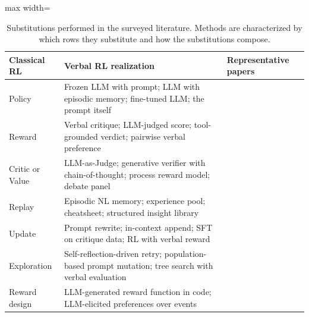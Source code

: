 \begin{table}[t]
\centering
\footnotesize
\setlength{\tabcolsep}{3pt}
\renewcommand{\arraystretch}{1.15}
\caption{Substitutions performed in the surveyed literature. Methods are characterized by which rows they substitute and how the substitutions compose.}
\label{tab:substitutions}
\begin{adjustbox}{max width=\textwidth}
\begin{tabular}{p{2.0cm}p{6.6cm}p{7.2cm}}
\toprule
\textbf{Classical RL} & \textbf{Verbal RL realization} & \textbf{Representative papers} \\
\midrule
Policy & Frozen LLM with prompt; LLM with episodic memory; fine-tuned LLM; the prompt itself & \citealp{madaan2023selfrefine,yuksekgonul2024textgrad,huang2022selfimprove,zelikman2022star} \\
Reward & Verbal critique; LLM-judged score; tool-grounded verdict; pairwise verbal preference & \citealp{luo2025fcp,lee2025feedback,akyurek2023rl4f,yuan2025selfrewarding} \\
Critic or Value & LLM-as-Judge; generative verifier with chain-of-thought; process reward model; debate panel & \citealp{hosseini2024vstar,chan2023chateval,zhang2025genrm,zhao2025genprm} \\
Replay & Episodic NL memory; experience pool; cheatsheet; structured insight library & \citealp{suzgun2026dynamic,cai2025flex,wang2026memento2,zhao2024expel} \\
Update & Prompt rewrite; in-context append; SFT on critique data; RL with verbal reward & \citealp{bai2022constitutional,wang2025cft,pryzant2023protegi,feng2025retool} \\
Exploration & Self-reflection-driven retry; population-based prompt mutation; tree search with verbal evaluation & \citealp{shinn2023reflexion,zhou2024lats,fernando2023promptbreeder} \\
Reward design & LLM-generated reward function in code; LLM-elicited preferences over events & \citealp{ma2024eureka,xie2024text2reward,klissarov2023motif} \\
\bottomrule
\end{tabular}
\end{adjustbox}
\end{table}
